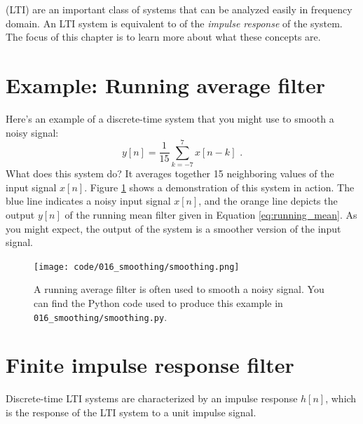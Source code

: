 (LTI) are an important class of systems that can be analyzed easily in frequency domain.
An LTI system is equivalent to \emph{} of the \emph{impulse response} of the system.
The focus of this chapter is to learn more about what these concepts are.

\section{Example: Running average filter}
Here's an example of a discrete-time system that you might use to smooth a noisy signal:
\begin{equation}
  y[n] = \frac{1}{15}\sum_{k=-7}^{7} x[n-k]\,\,.
  \label{eq:running_mean}
\end{equation}
What does this system do? It averages together 15 neighboring values of the input signal $x[n]$.
Figure \ref{fig:avg_filter} shows a demonstration of this system in action.
The blue line indicates a noisy input signal $x[n]$, and the orange line depicts the output
$y[n]$ of the running mean filter given in Equation \ref{eq:running_mean}.
As you might expect, the output of the system is a smoother version of the input signal.
\begin{figure}
  \begin{center}
    \texttt{[image: code/016\_smoothing/smoothing.png]}
  \end{center}
  \caption{A running average filter is often used to smooth a noisy
    signal. You can find the Python code used to produce this example
    in \texttt{016\_smoothing/smoothing.py}.}
  \label{fig:avg_filter}
\end{figure}

\section{Finite impulse response filter}
\begin{marginfigure}

  \begin{center}
  \end{center}
  \caption{Discrete-time LTI systems are characterized by an impulse response $h[n]$, 
  which is the response of the LTI system to a unit impulse signal.}
\end{marginfigure}

